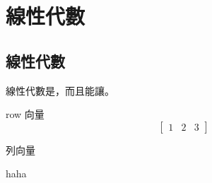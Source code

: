 \chapter{線性代數}

\section{線性代數}
線性代數是，而且能讓。


row 向量
$$\begin{bmatrix} 1 & 2 & 3 \end{bmatrix}$$

列向量


\begin{note}
haha
\end{note}
